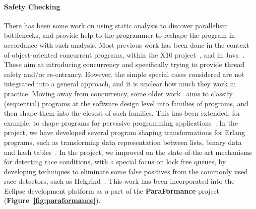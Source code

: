 \documentclass[a4paper,11pt]{article}
\begin{document}
\paragraph{Safety Checking}
There has been some work on using static analysis to discover
parallelism bottlenecks, and provide help to the programmer to reshape
the program in accordance with such analysis. Most previous work has
been done in the context of object-oriented concurrent programs,
within the X10 project~\cite{x10extract}, and in
Java~\cite{reentrancy}. These aim at introducing concurrency and
specifically trying to provide thread safety and/or
re-entrancy. However, the simple special cases considered are not
integrated into a general approach, and it is unclear how much they
work in practice.  Moving away from concurrency, some older
work~\cite{prog-families} aims to classify (sequential) programs at
the software design level into families of programs, and then shape
them into the closest of such families. This has been extended, for
example, to shape programs for pervasive programming
applications~\cite{Sadjadi:05}. In the \paraphrase{} project, we have
developed several program shaping transformations for Erlang programs,
such as transforming data representation between lists, binary data
and hash tables~\cite{erlangShaping}. In the \rephrase project, we improved
on the state-of-the-art mechanisms for detecting race conditions, with
a special focus on lock free queues, by developing techniques to eliminate
some false positives from the commonly used race detectors, such as
Helgrind~\cite{rephraseRaceDetection}. This work has been incorporated
into the Eclipse development platform as a part of the \textbf{ParaFormance}
project (\textbf{Figure~\ref{fig:paraformance}}).
\end{document}
